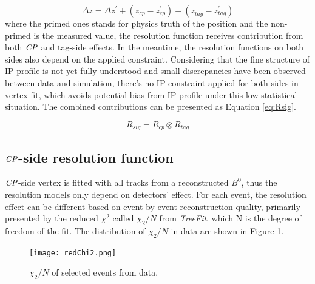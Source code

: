 \begin{equation}\label{eq:dz}
\Delta z 
=\Delta z^{'} + (z_{cp}^{}- z_{cp}^{'}) - (z_{tag}^{}- z_{tag}^{'}) 
\end{equation}where the primed ones stands for physics truth of the position and the non-primed is the measured value, the resolution function receives contribution from both $\it{CP}$ and tag-side effects. In the meantime, the resolution functions on both sides also depend on the applied constraint. Considering that the fine structure of IP profile is not yet fully understood and small discrepancies have been observed between data and simulation\cite{jpsiks_ichep}, there's no IP constraint applied for both sides in vertex fit, which avoids potential bias from  IP profile under this low statistical situation. The combined contributions can be presented as Equation \ref{eq:Rsig}.

\begin{equation}\label{eq:Rsig}
R_{sig}=R_{cp}\otimes R_{tag}
\end{equation}

\subsection{$\it{CP}$-side resolution function}

$\it{CP}$-side vertex is fitted with all tracks from a reconstructed $B^0$, thus the resolution models only depend on detectors' effect. For each event, the resolution effect can be different based on event-by-event reconstruction quality, primarily presented by the reduced $\chi^2$ called $\chi_2/N$ from \textit{TreeFit}, which N is the degree of freedom of the fit. The distribution of $\chi_2/N$ in data are shown in Figure \ref{fig:redchi2}. 

\begin{figure}[H]
	\centering
	\texttt{[image: redChi2.png]}
	\caption{$\chi_2/N$ of selected events from data.}
	\label{fig:redchi2}
\end{figure}

